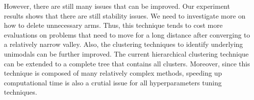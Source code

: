 However, there are still many issues that can be improved.
Our experiment results shows that there are still stability issues.
We need to investigate more on how to delete unnecessary arms.
Thus, this technique tends to cost more evaluations on problems 
that need to move for a long distance after converging to a relatively narrow valley.
Also, the clustering techniques to identify underlying unimodals can be further improved.
The current hierarchical clustering technique can be extended to a complete tree that contains all clusters.
Moreover, since this technique is composed of many relatively complex methods, 
speeding up computational time is also a crutial issue for all hyperparameters tuning techniques.



